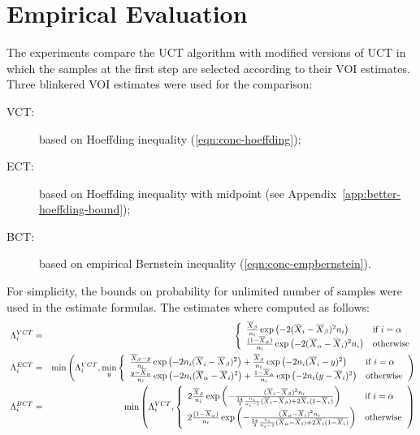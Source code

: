 \documentclass{article}
\begin{document}
\section{Empirical Evaluation}
\label{sec:empirical-evaluation}

The experiments compare the UCT algorithm \cite{Kocsis.uct} with modified
versions of UCT in which the samples at the first step are selected according
to their VOI estimates. Three blinkered VOI estimates were used for the comparison:
\begin{description}
\item[VCT:] based on Hoeffding inequality (\ref{eqn:conc-hoeffding});
\item[ECT:] based on Hoeffding inequality with midpoint (see Appendix~\ref{app:better-hoeffding-bound});
\item[BCT:] based on empirical Bernstein inequality (\ref{eqn:conc-empbernstein}).
\end{description}
For simplicity, the bounds on probability for unlimited number of samples were used in the estimate formulas. The estimates where computed as follows:
\begin{eqnarray}\
  \Lambda_i^{VCT}& =&\left\{
  \begin{array}{l l}
    \frac {\overline X_\beta} {n_i}\exp\left(- 2(\overline X_i - \overline X_\beta)^2 n_i\right)
      & \mbox{if $i=\alpha$} \\
    \frac {(1-\overline  X_\alpha)} {n_i}\exp\left(- 2(\overline X_\alpha - \overline X_i)^2 n_i\right)
      &  \mbox{otherwise}
  \end{array}  \right.\nonumber\\
  \Lambda_i^{ECT}& =&\min\left(\Lambda_i^{VCT}, \min_y\left\{
  \begin{array}{l l}
    \frac {\overline X_\beta-y} {n_i}\exp\left(-2 n_i(\overline X_i-\overline X_\beta)^2\right)
    +\frac {\overline X_\beta} {n_i}\exp\left(-2 n_i(\overline X_i-y)^2\right)
      & \mbox{if $i=\alpha$} \\
\frac {y-\overline X_\alpha} {n_i}\exp\left(-2 n_i(\overline X_\alpha-\overline
  X_i)^2\right)+\frac {1-\overline X_\alpha} {n_i}\exp\left(-2 n_i(y-\overline X_i)^2\right)
      &  \mbox{otherwise}
  \end{array} \right.\right) \nonumber\\
  \Lambda_i^{BCT}& =&\min\left(\Lambda_i^{VCT},\left\{
  \begin{array}{l l}
    2\frac {\overline X_\beta} {n_i}\exp\left(- \frac {(\overline X_i - \overline X_\beta)^2 n_i} {\frac {14} 3 \frac {n_i} {n_i-1}(\overline X_i - \overline X_\beta) + 2 \overline X_i(1-\overline X_i)} \right)
      & \mbox{if $i=\alpha$} \\
    2\frac {(1-\overline  X_\alpha)} {n_i}\exp\left(- \frac {(\overline X_\alpha - \overline X_i)^2 n_i} {\frac {14} 3 \frac {n_i} {n_i-1}(\overline X_\alpha - \overline X_i) + 2 \overline X_i(1-\overline X_i)} \right)
      &  \mbox{otherwise}
  \end{array} \right.\right)
\label{eqn:emp-estimates}
\end{eqnarray}
\end{document}
